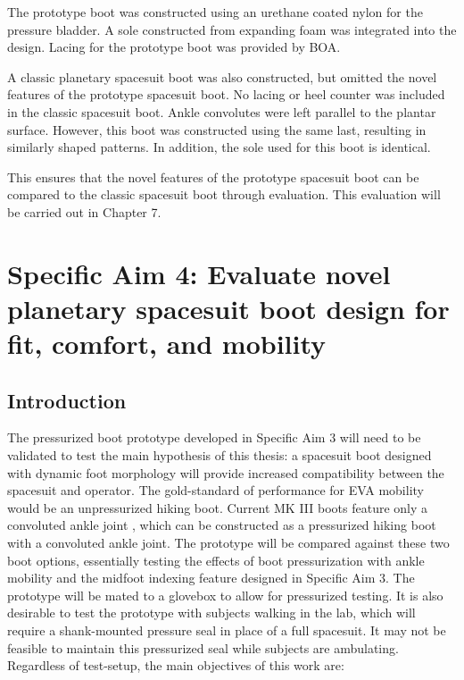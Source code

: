 \documentclass[defaultstyle,11pt]{comps}
\begin{document}
The prototype boot was constructed using an urethane coated nylon for the pressure bladder.
A sole constructed from expanding foam was integrated into the design.
Lacing for the prototype boot was provided by BOA.

A classic planetary spacesuit boot was also constructed, but omitted the novel features of the prototype spacesuit boot.
No lacing or heel counter was included in the classic spacesuit boot.
Ankle convolutes were left parallel to the plantar surface.
However, this boot was constructed using the same last, resulting in similarly shaped patterns.
In addition, the sole used for this boot is identical.

This ensures that the novel features of the prototype spacesuit boot can be compared to the classic spacesuit boot through evaluation.
This evaluation will be carried out in Chapter 7.

\hypertarget{specific-aim-4-evaluate-novel-planetary-spacesuit-boot-design-for-fit-comfort-and-mobility}{%
\chapter{Specific Aim 4: Evaluate novel planetary spacesuit boot design for fit, comfort, and mobility}\label{specific-aim-4-evaluate-novel-planetary-spacesuit-boot-design-for-fit-comfort-and-mobility}}

\hypertarget{introduction-3}{%
\section{Introduction}\label{introduction-3}}

The pressurized boot prototype developed in Specific Aim 3 will need to be validated to test the main hypothesis of this thesis: a spacesuit boot designed with dynamic foot morphology will provide increased compatibility between the spacesuit and operator.
The gold-standard of performance for EVA mobility would be an unpressurized hiking boot.
Current MK III boots feature only a convoluted ankle joint \citep{Ross2002}, which can be constructed as a pressurized hiking boot with a convoluted ankle joint.
The prototype will be compared against these two boot options, essentially testing the effects of boot pressurization with ankle mobility and the midfoot indexing feature designed in Specific Aim 3.
The prototype will be mated to a glovebox to allow for pressurized testing.
It is also desirable to test the prototype with subjects walking in the lab, which will require a shank-mounted pressure seal in place of a full spacesuit.
It may not be feasible to maintain this pressurized seal while subjects are ambulating.
Regardless of test-setup, the main objectives of this work are:
\end{document}
